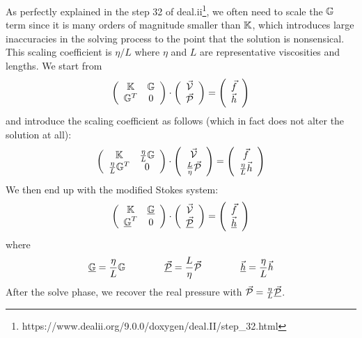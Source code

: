 
As perfectly explained in the step 32 of deal.ii\footnote{https://www.dealii.org/9.0.0/doxygen/deal.II/step\_32.html},
we often need to scale the ${\mathbb{G}}$ term since it is many orders of magnitude smaller than ${\mathbb{K}}$, 
which introduces large inaccuracies in the solving process to the point that the solution is nonsensical. 
This scaling coefficient is $\eta/L$ where $\eta$ and $L$ are representative viscosities and lengths. 
We start from 
\[
\left(
\begin{array}{cc}
{\mathbb{K}} & {\mathbb{G}} \\ {\mathbb{G}}^T & 0 
\end{array}
\right)
\cdot
\left(
\begin{array}{c}
\vec{\cal V} \\ \vec{\cal P}
\end{array}
\right)
=
\left(
\begin{array}{c}
\vec{f} \\ \vec{h}
\end{array}
\right)
\]
and introduce the scaling coefficient as follows (which in fact does not alter the solution at all):
\[
\left(
\begin{array}{cc}
{\mathbb{K}} & \frac{\eta}{L}{\mathbb{G}} \\ \frac{\eta}{L}{\mathbb{G}}^T & 0 
\end{array}
\right)
\cdot
\left(
\begin{array}{c}
\vec{\cal V} \\\frac{L}{\eta} \vec{\cal P}
\end{array}
\right)
=
\left(
\begin{array}{c}
 \vec{f} \\ \frac{\eta}{L} \vec{h}
\end{array}
\right)
\]
We then end up with the modified Stokes system:
\[
\left(
\begin{array}{cc}
{\mathbb{K}} & \underline{{\mathbb{G}}} \\ \underline{{\mathbb{G}}}^T & 0 
\end{array}
\right)
\cdot
\left(
\begin{array}{c}
\vec{\cal V} \\ \underline{\vec{\cal P}}
\end{array}
\right)
=
\left(
\begin{array}{c}
\vec{f} \\ \underline{\vec{h}}
\end{array}
\right)
\]
where 
\[
\underline{{\mathbb{G}}}=\frac{\eta}{L}{\mathbb{G}}
\quad\quad
\quad\quad
\underline{\vec{\cal P}}=\frac{L}{\eta} \vec{\cal P}
\quad\quad
\quad\quad
\underline{\vec{h}}=\frac{\eta}{L}\vec{h}
\]
After the solve phase, we recover the real pressure with $\vec{\cal P}=\frac{\eta}{L}\underline{\vec{\cal P}}$.





